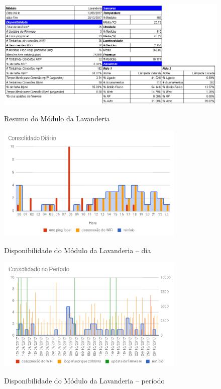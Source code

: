 \begin{figure}[H]
	\centering
	\caption{Resumo do Módulo da Lavanderia}
	\includegraphics[width=1.0\textwidth]{resumoLavanderia}
	\label{fig:resumoLavanderia}
\end{figure}

\begin{figure}[H]
	\centering
	\caption{Disponibilidade do Módulo da Lavanderia -- dia}
	\includegraphics[width=0.8\textwidth]{lavanderiadiadisp}
	\label{fig:lavanderiadiadisp}
\end{figure}

\begin{figure}[H]
	\centering
	\caption{Disponibilidade do Módulo da Lavanderia -- período}
	\includegraphics[width=0.8\textwidth]{lavanderiaperiododisp}
	\label{fig:lavanderiaperiododisp}
\end{figure}

